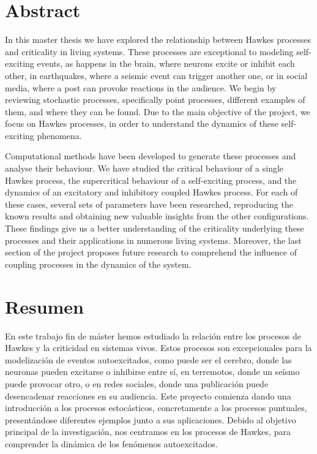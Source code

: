 \chapter*{Abstract}
In this master thesis we have explored the relationship between Hawkes processes and criticality in living systems. These processes are exceptional to modeling self-exciting events, as happens 
in the brain, where neurons excite or inhibit each other, in earthquakes, where a seismic event can trigger another one, or in social media, where a post can provoke reactions in the audience.
We begin by reviewing stochastic processes, specifically point processes, different examples of them, and where they can be found. Due to the main objective of the project, we focus on 
Hawkes processes, in order to understand the dynamics of these self-exciting phenomena. 

Computational methods have been developed to generate these processes and analyse their behaviour. We have studied the critical behaviour of a single Hawkes process,
the supercritical behaviour of a self-exciting process, and the dynamics of an excitatory and inhibitory coupled Hawkes process. For each of these cases, several sets of parameters have been
researched, reproducing the known results and obtaining new valuable insights from the other configurations.
These findings give us a better understanding of the criticality underlying these processes and their applications in numerous living systems. Moreover, the last section of the project
proposes future research to comprehend the influence of coupling processes in the dynamics of the system.

\chapter*{Resumen}

En este trabajo fin de máster hemos estudiado la relación entre los procesos de Hawkes y la criticidad en sistemas vivos. Estos procesos son excepcionales para la modelización de eventos 
autoexcitados, como puede ser el cerebro, donde las neuronas pueden excitarse o inhibirse entre sí, en terremotos, donde un seísmo puede provocar otro, o en redes sociales, donde una 
publicación puede desencadenar reacciones en su audiencia. Este proyecto comienza dando una introducción a los procesos estocásticos, concretamente a los procesos puntuales, presentándose 
diferentes ejemplos junto a sus aplicaciones. Debido al objetivo principal de la investigación, nos centramos en los procesos de Hawkes, para comprender la dinámica de los fenómenos autoexcitados.


